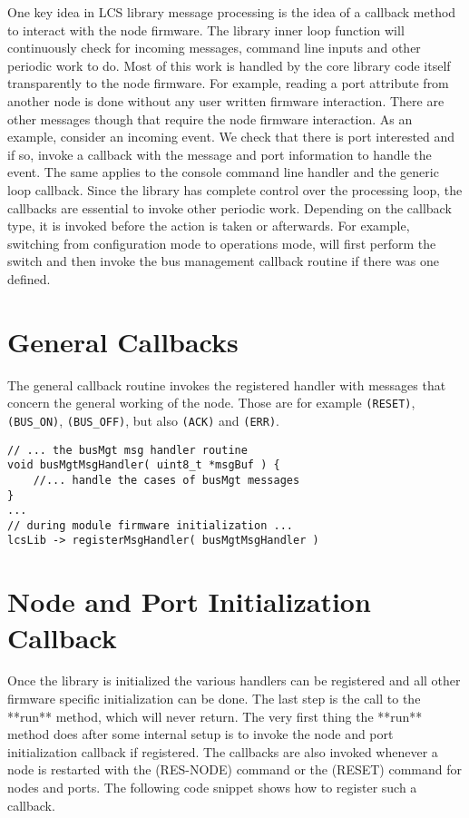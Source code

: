 One key idea in LCS library message processing is the idea of a callback method to interact with the node firmware. The library inner loop function will continuously check for incoming messages, command line inputs and other periodic work to do. Most of this work is handled by the core library code itself transparently to the node firmware. For example, reading a port attribute from another node is done without any user written firmware interaction. There are other messages though that require the node firmware interaction. As an example, consider an incoming event. We check that there is port interested and if so, invoke a callback with the message and port information to handle the event. The same applies to the console command line handler and the generic loop callback. Since the library has complete control over the processing loop, the callbacks are essential to invoke other periodic work. Depending on the callback type, it is invoked before the action is taken or afterwards. For example, switching from configuration mode to operations mode, will first perform the switch and then invoke the bus management callback routine if there was one defined.

\section{General Callbacks}

The general callback routine invokes the registered handler with messages that concern the general working of the node. Those are for example \texttt{(RESET)}, \texttt{(BUS\_ON)}, \texttt{(BUS\_OFF)}, but also \texttt{(ACK)} and \texttt{(ERR)}.

\lstset{style=codesnippetstyle}
\begin{lstlisting}
// ... the busMgt msg handler routine
void busMgtMsgHandler( uint8_t *msgBuf ) {
	//... handle the cases of busMgt messages
}
...
// during module firmware initialization ...
lcsLib -> registerMsgHandler( busMgtMsgHandler )
\end{lstlisting}

\section{Node and Port Initialization Callback}

Once the library is initialized the various handlers can be registered and all other firmware specific initialization can be done. The last step is the call to the **run** method, which will never return. The very first thing the **run** method does after some internal setup is to invoke the node and port initialization callback if registered. The callbacks are also invoked whenever a node is restarted with the (RES-NODE) command or the (RESET) command for nodes and ports. The following code snippet shows how to register such a callback.

